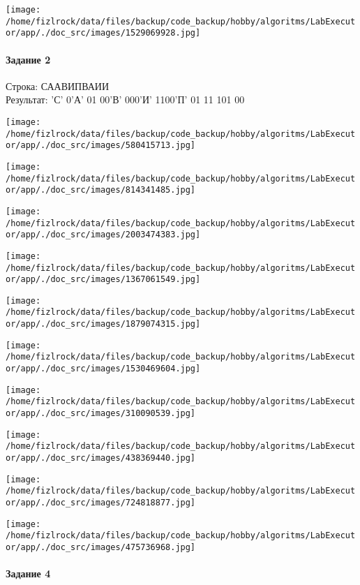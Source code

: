 \documentclass[a4paper, 12pt]{article}
\begin{document}
\texttt{[image: /home/fizlrock/data/files/backup/code\_backup/hobby/algoritms/LabExecutor/app/./doc\_src/images/1529069928.jpg]}
\pagebreak
\paragraph{Задание 2}

Строка: 
СААВИПВАИИ\\
Результат: 'С' 0'А' 01 00'В' 000'И' 1100'П' 01 11 101 00

\texttt{[image: /home/fizlrock/data/files/backup/code\_backup/hobby/algoritms/LabExecutor/app/./doc\_src/images/580415713.jpg]}

\texttt{[image: /home/fizlrock/data/files/backup/code\_backup/hobby/algoritms/LabExecutor/app/./doc\_src/images/814341485.jpg]}

\texttt{[image: /home/fizlrock/data/files/backup/code\_backup/hobby/algoritms/LabExecutor/app/./doc\_src/images/2003474383.jpg]}

\texttt{[image: /home/fizlrock/data/files/backup/code\_backup/hobby/algoritms/LabExecutor/app/./doc\_src/images/1367061549.jpg]}

\texttt{[image: /home/fizlrock/data/files/backup/code\_backup/hobby/algoritms/LabExecutor/app/./doc\_src/images/1879074315.jpg]}

\texttt{[image: /home/fizlrock/data/files/backup/code\_backup/hobby/algoritms/LabExecutor/app/./doc\_src/images/1530469604.jpg]}

\texttt{[image: /home/fizlrock/data/files/backup/code\_backup/hobby/algoritms/LabExecutor/app/./doc\_src/images/310090539.jpg]}

\texttt{[image: /home/fizlrock/data/files/backup/code\_backup/hobby/algoritms/LabExecutor/app/./doc\_src/images/438369440.jpg]}

\texttt{[image: /home/fizlrock/data/files/backup/code\_backup/hobby/algoritms/LabExecutor/app/./doc\_src/images/724818877.jpg]}

\texttt{[image: /home/fizlrock/data/files/backup/code\_backup/hobby/algoritms/LabExecutor/app/./doc\_src/images/475736968.jpg]}
\pagebreak
\paragraph{Задание 4}
\end{document}

